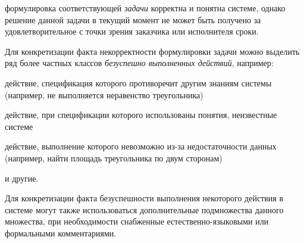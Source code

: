 \begin{SCn}
\begin{scnsubstruct}
\begin{scneqtoset}
{\begin{scnsubdividing}
{{\begin{scnitemize}
                                \item формулировка соответствующей \textit{задачи} корректна и понятна системе, однако решение данной задачи в текущий момент не может быть получено за удовлетворительное с точки зрения заказчика или исполнителя сроки.
                            \end{scnitemize}
                            Для конкретизации факта некорректности формулировки задачи можно выделить ряд более частных классов \textit{безуспешно выполненных действий}, например:
                            \begin{scnitemize}
                                \item действие, спецификация которого противоречит другим знаниям системы (например, не выполняется неравенство треугольника)
                                \item действие, при спецификации которого использованы понятия, неизвестные системе
                                \item действие, выполнение которого невозможно из-за недостаточности данных (например, найти площадь треугольника по двум сторонам)
                                \item и другие.
                            \end{scnitemize}
                            Для конкретизации факта безуспешности выполнения некоторого действия в системе могут также использоваться дополнительные подмножества данного множества, при необходимости снабженные естественно-языковыми или формальными комментариями.}
                    }
                \end{scnsubdividing}
            }
        \end{scneqtoset}
        \begin{scneqtoset}

\end{scneqtoset}
\end{scnsubstruct}
\end{SCn}
